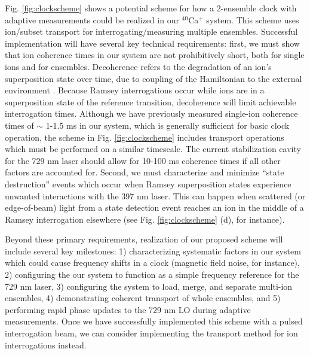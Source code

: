 Fig. \ref{fig:clockscheme} shows a potential scheme for how a 2-ensemble clock with adaptive measurements could be realized in our $^{40}$Ca$^+$ system. This scheme uses ion/subset transport for interrogating/measuring multiple ensembles. Successful implementation will have several key technical requirements: first, we must show that ion coherence times in our system are not prohibitively short, both for single ions and for ensembles. Decoherence refers to the degradation of an ion's superposition state over time, due to coupling of the Hamiltonian to the external environment \cite{PhysRevA.57.3748, SACKETT2003431, RevModPhys.75.715}. Because Ramsey interrogations occur while ions are in a superposition state of the reference transition, decoherence will limit achievable interrogation times. Although we have previously measured single-ion coherence times of $\sim$ 1-1.5 ms in our system, which is generally sufficient for basic clock operation, the scheme in Fig. \ref{fig:clockscheme} includes transport operations which must be performed on a similar timescale. The current stabilization cavity for the 729 nm laser should allow for 10-100 ms coherence times if all other factors are accounted for. Second, we must characterize and minimize ``state destruction'' events which occur when Ramsey superposition states experience unwanted interactions with the 397 nm laser. This can happen when scattered (or edge-of-beam) light from a state detection event reaches an ion in the middle of a Ramsey interrogation elsewhere (see Fig. \ref{fig:clockscheme} (d), for instance). 

Beyond these primary requirements, realization of our proposed scheme will include several key milestones: 1) characterizing systematic factors in our system which could cause frequency shifts in a clock (magnetic field noise, for instance), 2) configuring the our system to function as a simple frequency reference for the 729 nm laser, 3) configuring the system to load, merge, and separate multi-ion ensembles, 4) demonstrating coherent transport of whole ensembles, and 5) performing rapid phase updates to the 729 nm LO during adaptive measurements. Once we have successfully implemented this scheme with a pulsed interrogation beam, we can consider implementing the transport method for ion interrogations instead. 












